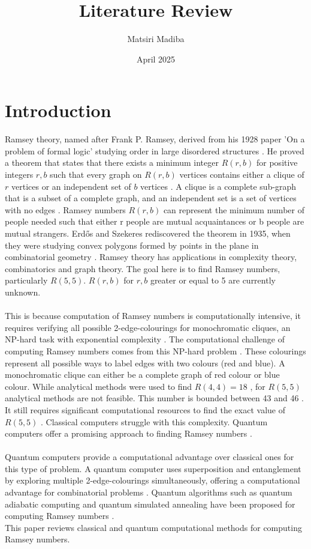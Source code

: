 \documentclass{Assignment}
\author{Matsiri Madiba}
\date{April 2025}
\title{Literature Review}
\begin{document}
\maketitle
\section{Introduction}
Ramsey theory, named after Frank P. Ramsey, derived from his 1928 paper 'On a problem of formal logic' studying order in large disordered structures \cite{graham1980ramsey}.
He proved a theorem that states that there exists a minimum integer $R(r,b)$ for positive integers $r, b$ such that every graph on $R(r,b)$ vertices contains either a clique of $r$ vertices or an independent set of $b$ vertices \cite{BondyMurty2008}.
A clique is a complete sub-graph that is a subset of a complete graph, and an independent set is a set of vertices with no edges \cite{BondyMurty2008}.	
Ramsey numbers $R(r,b)$ can represent the minimum number of people needed such that either r people are mutual acquaintances or b people are mutual strangers.
Erd\H{o}s and Szekeres rediscovered the theorem in 1935, when they were studying convex polygons formed by points in the plane in combinatorial geometry \cite{BondyMurty2008}.
Ramsey theory has applications in complexity theory, combinatorics and graph theory. 
The goal here is to find Ramsey numbers, particularly $R(5,5)$.
$R(r,b)$ for $r,b$ greater or equal to 5 are currently unknown.
\\\\
This is because computation of Ramsey numbers is computationally intensive, it requires verifying all possible 2-edge-colourings for monochromatic cliques, an NP-hard task with exponential complexity \cite{PhysRevA.93.032301, burr1981generalized}.
The computational challenge of computing Ramsey numbers comes from this NP-hard problem \cite{burr1981generalized}.
These colourings represent all possible ways to label edges with two colours (red and blue).
A monochromatic clique can either be a complete graph of red colour or blue colour.
While analytical methods were used to find $R(4,4)=18$ \cite{GreenwoodGleason1955},
for $R(5,5)$ analytical methods are not feasible.
This number is bounded between 43 \cite{Exoo1993} and 46 \cite{angeltveit2024r55le46}.
It still requires significant computational resources to find the exact value of $R(5,5)$ \cite{spencer1994}.
Classical computers struggle with this complexity.
Quantum computers offer a promising approach to finding Ramsey numbers \cite{PhysRevA.93.032301}.
\\\\
Quantum computers provide a computational advantage over classical ones for this type of problem.
A quantum computer uses superposition and entanglement by exploring multiple 2-edge-colourings simultaneously, offering a computational advantage for combinatorial problems  \cite{Deutsch1989,PhysRevA.93.032301}.
Quantum algorithms such as quantum adiabatic computing and quantum simulated annealing have been proposed for computing Ramsey numbers \cite{gaitan2012ramsey, PhysRevA.93.032301}.
\\
This paper reviews classical and quantum computational methods for computing Ramsey numbers.
\end{document}
